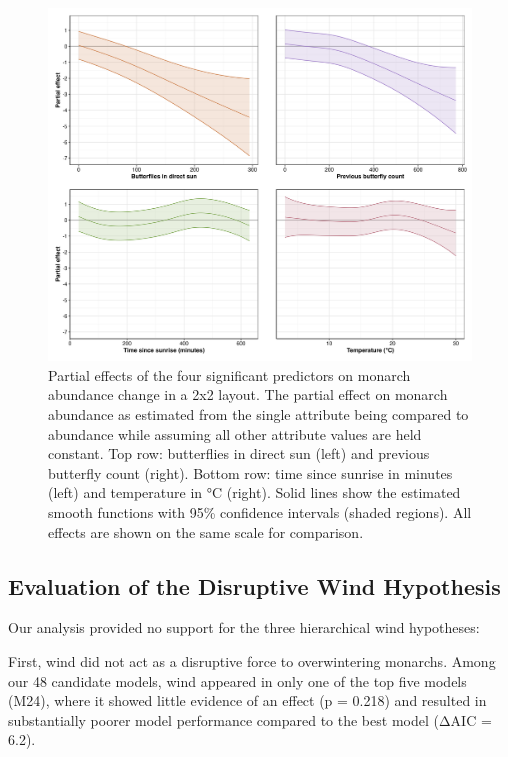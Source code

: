 \begin{figure}[htbp]
\centering
\includegraphics[width=\textwidth]{figures/results/combined_partial_effects_2x2_final.png}
\caption{Partial effects of the four significant predictors on monarch abundance change in a 2x2 layout. The partial effect on monarch abundance as estimated from the single attribute being compared to abundance while assuming all other attribute values are held constant. Top row: butterflies in direct sun (left) and previous butterfly count (right). Bottom row: time since sunrise in minutes (left) and temperature in °C (right). Solid lines show the estimated smooth functions with 95\% confidence intervals (shaded regions). All effects are shown on the same scale for comparison.}\label{fig:partial_effects}
\end{figure}

\subsection{Evaluation of the Disruptive Wind Hypothesis}

Our analysis provided no support for the three hierarchical wind hypotheses:

First, wind did not act as a disruptive force to overwintering monarchs. Among our 48 candidate models, wind appeared in only one of the top five models (M24), where it showed little evidence of an effect (p = 0.218) and resulted in substantially poorer model performance compared to the best model (ΔAIC = 6.2).

